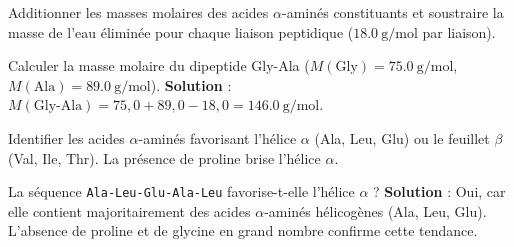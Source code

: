 Additionner les masses molaires des acides $\alpha$-aminés constituants et soustraire la masse de l'eau éliminée pour chaque liaison peptidique ($\SI{18.0}{\gram\per\mol}$ par liaison).

\begin{exemple}
Calculer la masse molaire du dipeptide Gly-Ala ($M(\text{Gly}) = \SI{75.0}{\gram\per\mol}$, $M(\text{Ala}) = \SI{89.0}{\gram\per\mol}$).
\textbf{Solution} : $M(\text{Gly-Ala}) = 75,0 + 89,0 - 18,0 = \SI{146.0}{\gram\per\mol}$.
\end{exemple}

Identifier les acides $\alpha$-aminés favorisant l'hélice $\alpha$ (Ala, Leu, Glu) ou le feuillet $\beta$ (Val, Ile, Thr). La présence de proline brise l'hélice $\alpha$.

\begin{exemple}
La séquence \texttt{Ala-Leu-Glu-Ala-Leu} favorise-t-elle l'hélice $\alpha$ ?
\textbf{Solution} : Oui, car elle contient majoritairement des acides $\alpha$-aminés hélicogènes (Ala, Leu, Glu). L'absence de proline et de glycine en grand nombre confirme cette tendance.
\end{exemple}